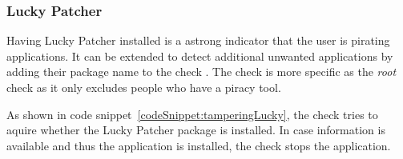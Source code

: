 \subsubsection{Lucky Patcher} \label{subsection:counter-improve-tampering-luckypatcher}
Having Lucky Patcher installed is a astrong indicator that the user is pirating applications.
It can be extended to detect additional unwanted applications by adding their package name to the check \cite{androidCrackingTools}.
The check is more specific as the \textit{root} check as it only excludes people who have a piracy tool.
\newline

As shown in code snippet~\ref{codeSnippet:tamperingLucky}, the check tries to aquire whether the Lucky Patcher package is installed.
In case information is available and thus the application is installed, the check stops the application.
